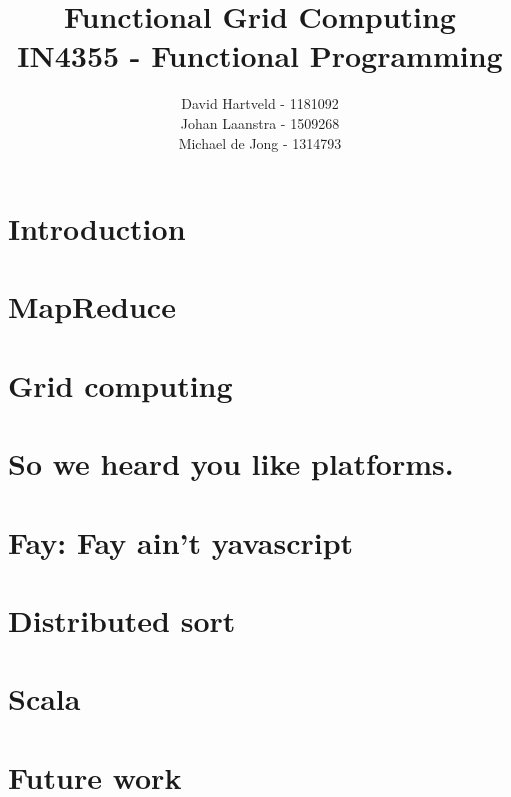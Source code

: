 \documentclass{article}
\title{Functional Grid Computing\\
IN4355 - Functional Programming}
\author{David Hartveld - 1181092 \\
		Johan Laanstra - 1509268 \\
		Michael de Jong - 1314793}
\begin{document}
\maketitle

\section{Introduction}
	
		
\section{MapReduce}
	
	
\section{Grid computing}
	
	
\section{So we heard you like platforms.}
	
	
\section{Fay: Fay ain't yavascript}
	
	
\section{Distributed sort}
	
	
\section{Scala}
	
	
	
\section{Future work}
	
	


\end{document}
